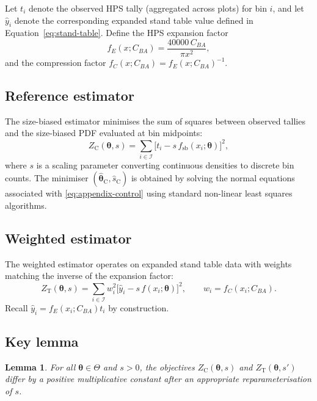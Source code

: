 \documentclass[12pt]{article}
\newtheorem{lemma}{Lemma}
\begin{document}
Let $t_i$ denote the observed HPS tally (aggregated across plots) for bin $i$,
and let $\hat{y}_i$ denote the corresponding expanded stand table value defined
in Equation~\eqref{eq:stand-table}. Define the HPS expansion factor
\begin{equation}
  f_E(x; C_{BA}) = \frac{40000 \, C_{BA}}{\pi x^2},
\end{equation}
and the compression factor $f_C(x; C_{BA}) = f_E(x; C_{BA})^{-1}$.

\subsection{Reference estimator}

The size-biased estimator minimises the sum of squares between observed tallies
and the size-biased PDF evaluated at bin midpoints:
\begin{equation}
  Z_{\mathrm{C}}(\boldsymbol{\theta}, s)
  =
  \sum_{i \in \mathcal{I}}
  \Big[t_i - s\, f_{\mathrm{sb}}(x_i; \boldsymbol{\theta})\Big]^2,
  \label{eq:appendix-control}
\end{equation}
where $s$ is a scaling parameter converting continuous densities to discrete
bin counts. The minimiser $(\hat{\boldsymbol{\theta}}_{\mathrm{C}},\hat{s}_{\mathrm{C}})$ is
obtained by solving the normal equations associated with
\eqref{eq:appendix-control} using standard non-linear least squares algorithms.

\subsection{Weighted estimator}

The weighted estimator operates on expanded stand table data with weights
matching the inverse of the expansion factor:
\begin{equation}
  Z_{\mathrm{T}}(\boldsymbol{\theta}, s)
  =
  \sum_{i \in \mathcal{I}}
  w_i^2 
  \Big[\hat{y}_i - s\, f(x_i; \boldsymbol{\theta})\Big]^2,
  \qquad
  w_i = f_C(x_i; C_{BA}).
  \label{eq:appendix-test}
\end{equation}
Recall $\hat{y}_i = f_E(x_i; C_{BA}) t_i$ by construction.

\subsection{Key lemma}

\begin{lemma}
For all $\boldsymbol{\theta}\in\Theta$ and $s>0$, the objectives
$Z_{\mathrm{C}}(\boldsymbol{\theta}, s)$ and $Z_{\mathrm{T}}(\boldsymbol{\theta}, s')$ differ
by a positive multiplicative constant after an appropriate reparameterisation of
$s$.
\end{lemma}
\end{document}
